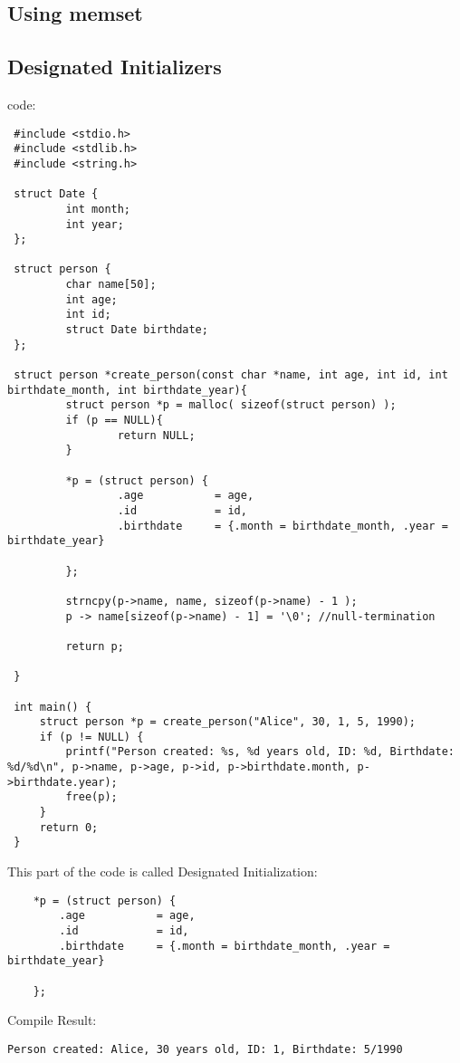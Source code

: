 \subsection{Using memset}



\subsection{Designated Initializers}
code:
\begin{lstlisting}
 #include <stdio.h>
 #include <stdlib.h>
 #include <string.h>

 struct Date {
         int month;
         int year;
 };

 struct person {
         char name[50];
         int age;
         int id;
         struct Date birthdate;
 };

 struct person *create_person(const char *name, int age, int id, int birthdate_month, int birthdate_year){
         struct person *p = malloc( sizeof(struct person) );
         if (p == NULL){
                 return NULL;
         }

         *p = (struct person) {
                 .age           = age,
                 .id            = id,
                 .birthdate     = {.month = birthdate_month, .year = birthdate_year}

         };

         strncpy(p->name, name, sizeof(p->name) - 1 );
         p -> name[sizeof(p->name) - 1] = '\0'; //null-termination

         return p;

 }

 int main() {
     struct person *p = create_person("Alice", 30, 1, 5, 1990);
     if (p != NULL) {
         printf("Person created: %s, %d years old, ID: %d, Birthdate: %d/%d\n", p->name, p->age, p->id, p->birthdate.month, p->birthdate.year);
         free(p);
     }
     return 0;
 }               
\end{lstlisting}

This part of the code is called Designated Initialization:
\begin{verbatim}
    *p = (struct person) {
        .age           = age,
        .id            = id,
        .birthdate     = {.month = birthdate_month, .year = birthdate_year}
    
    };
\end{verbatim}

Compile Result:
\begin{lstlisting}
Person created: Alice, 30 years old, ID: 1, Birthdate: 5/1990
\end{lstlisting}
